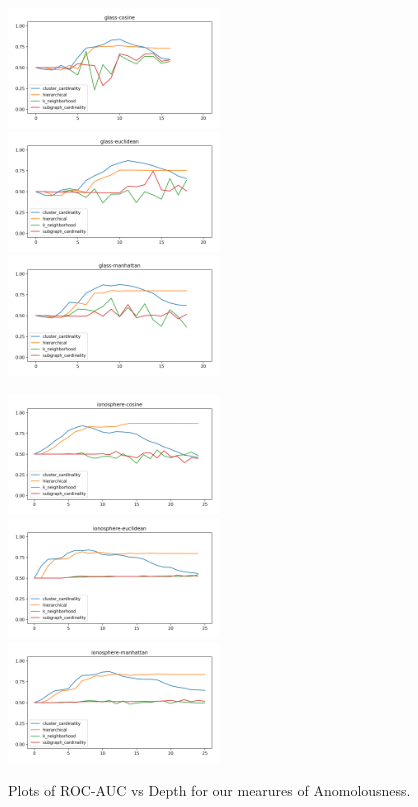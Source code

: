 \begin{figure}[!t]
\includegraphics[width=2.2in]{kdd/static/auc_vs_depth/glass-cosine.png}
\includegraphics[width=2.2in]{kdd/static/auc_vs_depth/glass-euclidean.png}
\includegraphics[width=2.2in]{kdd/static/auc_vs_depth/glass-manhattan.png}

\includegraphics[width=2.2in]{kdd/static/auc_vs_depth/ionosphere-cosine.png}
\includegraphics[width=2.2in]{kdd/static/auc_vs_depth/ionosphere-euclidean.png}
\includegraphics[width=2.2in]{kdd/static/auc_vs_depth/ionosphere-manhattan.png}

\caption{
Plots of ROC-AUC vs Depth for our mearures of Anomolousness.
}

\label{results:datasets_1}
\end{figure}


